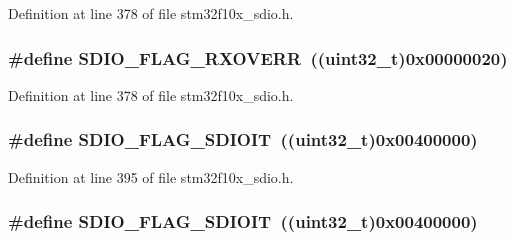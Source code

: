 Definition at line 378 of file stm32f10x\+\_\+sdio.\+h.

\subsubsection[{\texorpdfstring{S\+D\+I\+O\+\_\+\+F\+L\+A\+G\+\_\+\+R\+X\+O\+V\+E\+RR}{SDIO_FLAG_RXOVERR}}]{\setlength{\rightskip}{0pt plus 5cm}\#define S\+D\+I\+O\+\_\+\+F\+L\+A\+G\+\_\+\+R\+X\+O\+V\+E\+RR~(({\bf uint32\+\_\+t})0x00000020)}\hypertarget{group___s_d_i_o___flags_gad49d60039e40d31b734cfacf90caa84f}{}\label{group___s_d_i_o___flags_gad49d60039e40d31b734cfacf90caa84f}


Definition at line 378 of file stm32f10x\+\_\+sdio.\+h.

\subsubsection[{\texorpdfstring{S\+D\+I\+O\+\_\+\+F\+L\+A\+G\+\_\+\+S\+D\+I\+O\+IT}{SDIO_FLAG_SDIOIT}}]{\setlength{\rightskip}{0pt plus 5cm}\#define S\+D\+I\+O\+\_\+\+F\+L\+A\+G\+\_\+\+S\+D\+I\+O\+IT~(({\bf uint32\+\_\+t})0x00400000)}\hypertarget{group___s_d_i_o___flags_gae888ec1c9885c35a5f8e01bcffe324a1}{}\label{group___s_d_i_o___flags_gae888ec1c9885c35a5f8e01bcffe324a1}


Definition at line 395 of file stm32f10x\+\_\+sdio.\+h.

\subsubsection[{\texorpdfstring{S\+D\+I\+O\+\_\+\+F\+L\+A\+G\+\_\+\+S\+D\+I\+O\+IT}{SDIO_FLAG_SDIOIT}}]{\setlength{\rightskip}{0pt plus 5cm}\#define S\+D\+I\+O\+\_\+\+F\+L\+A\+G\+\_\+\+S\+D\+I\+O\+IT~(({\bf uint32\+\_\+t})0x00400000)}\hypertarget{group___s_d_i_o___flags_gae888ec1c9885c35a5f8e01bcffe324a1}{}\label{group___s_d_i_o___flags_gae888ec1c9885c35a5f8e01bcffe324a1}


